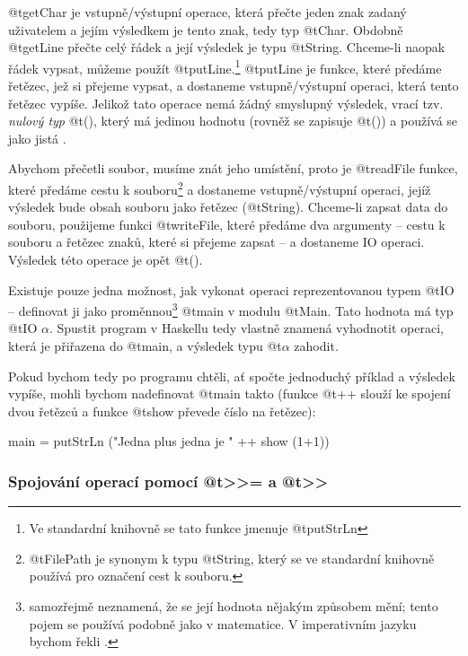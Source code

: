 @t{getChar} je vstupně/výstupní operace, která přečte jeden znak zadaný
uživatelem a jejím výsledkem je tento znak, tedy typ @t{Char}. Obdobně
@t{getLine} přečte celý řádek a její výsledek je typu @t{String}. Chceme-li
naopak řádek vypsat, můžeme použít @t{putLine}.\footnote{Ve standardní knihovně
se tato funkce jmenuje @t{putStrLn}} @t{putLine} je funkce, které
předáme řetězec, jež si přejeme vypsat, a dostaneme vstupně/výstupní operaci,
která tento řetězec vypíše. Jelikož tato operace nemá žádný smyslupný výsledek,
vrací tzv. \emph{nulový typ} @t{()}, který má jedinou hodnotu (rovněž se zapisuje
@t{()}) a používá se jako jistá .

Abychom přečetli soubor, musíme znát jeho umístění, proto je @t{readFile}
funkce, které předáme cestu k souboru\footnote{@t{FilePath} je synonym k typu
  @t{String}, který se ve standardní knihovně používá pro označení cest k
souboru.} a dostaneme vstupně/výstupní operaci, jejíž výsledek bude obsah
souboru jako řetězec (@t{String}). Chceme-li zapsat data do souboru, použijeme
funkci @t{writeFile}, které předáme dva argumenty -- cestu k souboru a řetězec
znaků, které si přejeme zapsat -- a dostaneme IO operaci. Výsledek této operace
je opět @t{()}.

Existuje pouze jedna možnost, jak vykonat operaci reprezentovanou typem @t{IO}
-- definovat ji jako proměnnou\footnote{ samozřejmě neznamená, že
  se její hodnota nějakým způsobem mění; tento pojem se používá podobně jako v
matematice. V imperativním jazyku bychom řekli .} @t{main} v
modulu @t{Main}. Tato hodnota má typ @t{IO $\alpha$}. Spustit program v Haskellu
tedy vlastně znamená vyhodnotit operaci, která je přiřazena do @t{main}, a
výsledek typu @t{$\alpha$} zahodit.

Pokud bychom tedy po programu chtěli, ať spočte jednoduchý příklad a výsledek
vypíše, mohli bychom nadefinovat @t{main} takto (funkce @t{++} slouží ke spojení
dvou řetězců a funkce @t{show} převede číslo na řetězec):

\begin{haskell}
main = putStrLn ("Jedna plus jedna je " ++ show (1+1))
\end{haskell}

\subsubsection{\texorpdfstring
  {Spojování operací pomocí @t{>>=} a @t{>>}}
  {Spojování operací pomocí >>= a >>}}

